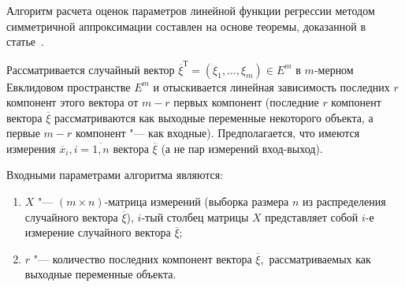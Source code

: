 Алгоритм расчета оценок параметров линейной функции регрессии
методом симметричной аппроксимации составлен на основе теоремы, доказанной в статье~\cite{mukha_2016}.

Рассматривается случайный вектор \( \overline{\xi}^{\text{Т}} = (\xi_1, \ldots, \xi_m ) \in E^m \)
в \( m \)-мерном Евклидовом пространстве \( E^m \) и отыскивается линейная
зависимость последних \( r \) компонент этого вектора от \( m - r \) первых компонент
(последние \( r \) компонент вектора \( \overline{\xi} \) рассматриваются как выходные
переменные некоторого объекта, а первые \( m - r \) компонент "--- как входные).
Предполагается, что имеются измерения \( \overline{x}_i, i = \overline{1, n} \)
вектора \( \overline{\xi} \) (а не пар измерений вход-выход).

Входными параметрами алгоритма являются:
\begin{enumerate}
\item \( X \) "--- \( (m \times n) \)-матрица измерений
  (выборка размера \( n \) из распределения случайного вектора \( \overline{\xi} \)),
  \( i \)-тый столбец матрицы \( X \) представляет собой \( i \)-е измерение случайного
  вектора \( \overline{\xi} \);
\item \( r \) "--- количество последних компонент вектора \( \overline{\xi} \),\
  рассматриваемых как выходные переменные объекта.
\end{enumerate}

